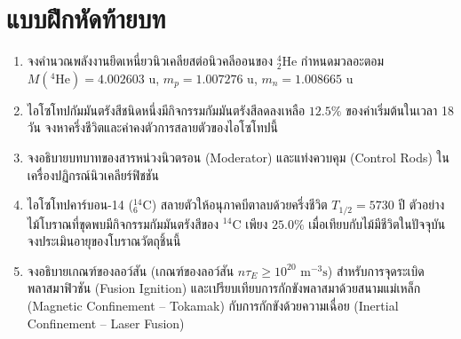 \section{แบบฝึกหัดท้ายบท}
\begin{enumerate}
    \item จงคำนวณพลังงานยึดเหนี่ยวนิวเคลียสต่อนิวคลีออนของ $^{4}_{2}\text{He}$ กำหนดมวลอะตอม $M(^4\text{He}) = 4.002603\text{ u}$, $m_p = 1.007276\text{ u}$, $m_n = 1.008665\text{ u}$
    \item ไอโซโทปกัมมันตรังสีชนิดหนึ่งมีกิจกรรมกัมมันตรังสีลดลงเหลือ $12.5\%$ ของค่าเริ่มต้นในเวลา 18 วัน จงหาครึ่งชีวิตและค่าคงตัวการสลายตัวของไอโซโทปนี้
    \item จงอธิบายบทบาทของสารหน่วงนิวตรอน (Moderator) และแท่งควบคุม (Control Rods) ในเครื่องปฏิกรณ์นิวเคลียร์ฟิชชัน
    \item ไอโซโทปคาร์บอน-14 ($^{14}_{6}\text{C}$) สลายตัวให้อนุภาคบีตาลบด้วยครึ่งชีวิต $T_{1/2} = 5730\text{ ปี}$ ตัวอย่างไม้โบราณที่ขุดพบมีกิจกรรมกัมมันตรังสีของ $^{14}\text{C}$ เพียง $25.0\%$ เมื่อเทียบกับไม้มีชีวิตในปัจจุบัน จงประเมินอายุของโบราณวัตถุชิ้นนี้
    \item จงอธิบายเกณฑ์ของลอว์สัน (เกณฑ์ของลอว์สัน $n \tau_E \ge 10^{20}\text{ m}^{-3}\text{s}$) สำหรับการจุดระเบิดพลาสมาฟิวชัน (Fusion Ignition) และเปรียบเทียบการกักขังพลาสมาด้วยสนามแม่เหล็ก (Magnetic Confinement -- Tokamak) กับการกักขังด้วยความเฉื่อย (Inertial Confinement -- Laser Fusion)
\end{enumerate}
